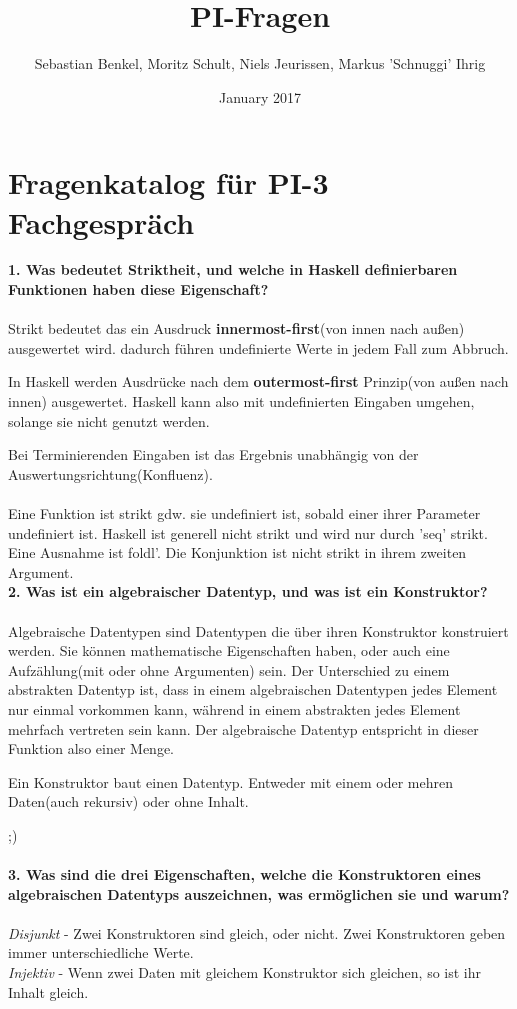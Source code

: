 \documentclass{article}
\title{PI-Fragen}
\author{Sebastian Benkel, Moritz Schult, Niels Jeurissen, Markus 'Schnuggi' Ihrig}
\date{January 2017}
\begin{document}
\maketitle

\section{Fragenkatalog für PI-3 Fachgespräch}


\textbf{1. Was bedeutet Striktheit, und welche in Haskell definierbaren Funktionen haben diese Eigenschaft?}
\\
\\
Strikt bedeutet das ein Ausdruck \textbf{innermost-first}(von innen nach au\ss en) ausgewertet wird. dadurch f\"uhren undefinierte Werte in jedem Fall zum Abbruch.


In Haskell werden Ausdr\"ucke nach dem \textbf{outermost-first} Prinzip(von au\ss en nach innen) ausgewertet. Haskell kann also mit undefinierten Eingaben umgehen, solange sie nicht genutzt werden.

Bei Terminierenden Eingaben ist das Ergebnis unabh\"angig von der Auswertungsrichtung(Konfluenz).
\\
\\
Eine Funktion ist strikt gdw. sie undefiniert ist, sobald einer ihrer Parameter undefiniert ist. Haskell ist generell nicht strikt und wird nur durch 'seq' strikt. Eine Ausnahme ist foldl'. Die Konjunktion ist nicht strikt in ihrem zweiten Argument.\\
\textbf{2. Was ist ein algebraischer Datentyp, und was ist ein Konstruktor?}
\\
\\
Algebraische Datentypen sind Datentypen die \"uber ihren Konstruktor konstruiert werden. Sie können mathematische Eigenschaften haben, oder auch eine Aufz\"ahlung(mit oder ohne Argumenten) sein.
Der Unterschied zu einem abstrakten Datentyp ist, dass in einem algebraischen Datentypen jedes Element nur einmal vorkommen kann, während in einem abstrakten jedes Element mehrfach vertreten sein kann. Der algebraische Datentyp entspricht in dieser Funktion also einer Menge.

Ein Konstruktor baut einen Datentyp. Entweder mit einem oder mehren Daten(auch rekursiv) oder ohne Inhalt.

;)
\\
\\

\textbf{3. Was sind die drei Eigenschaften, welche die Konstruktoren eines algebraischen Datentyps auszeichnen, was ermöglichen sie und warum?}
\\
\\
\emph{Disjunkt} - Zwei Konstruktoren sind gleich, oder nicht. Zwei Konstruktoren geben immer unterschiedliche Werte.
\\
\emph{Injektiv} - Wenn zwei Daten mit gleichem Konstruktor sich gleichen, so ist ihr Inhalt gleich. 
\end{document}
